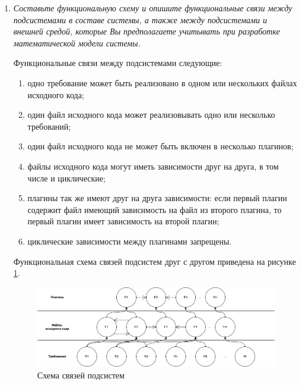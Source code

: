 \documentclass{article}
\begin{document}
\begin{enumerate}
        Альтернативу <<1 требование - 1 плагин>> целесообразно применять при $|R^*| \not \gg 0$.

        Альтернативу <<все требования - 1 плагин>> целесообразно применять при $|R^*_{n}| \approx |R^*|$.

        \item \textit{Составьте функциональную схему и опишите функциональные связи между подсистемами в составе системы, а также между подсистемами и внешней средой, которые Вы предполагаете учитывать при разработке математической модели системы.}

        Функциональные связи между подсистемами следующие:
        \begin{enumerate}
            \item одно требование может быть реализовано в одном или нескольких файлах исходного кода;
            \item один файл исходного кода может реализовывать одно или несколько требований;
            \item один файл исходного кода не может быть включен в несколько плагинов;
            \item файлы исходного кода могут иметь зависимости друг на друга, в том числе и циклические;
            \item плагины так же имеют друг на друга зависимости: если первый плагин содержит файл имеющий зависимость на файл из второго плагина, то первый плагин имеет зависимость на второй плагин;
            \item циклические зависимости между плагинами запрещены.
        \end{enumerate}

        Функциональная схема связей подсистем друг с другом приведена на рисунке \ref{fig:graph}.

        \begin{figure}[H]
            \centering
            \includegraphics[width=1\textwidth]{graph}
            \caption{Схема связей подсистем}
            \label{fig:graph}
        \end{figure}


\end{enumerate}
\end{document}
